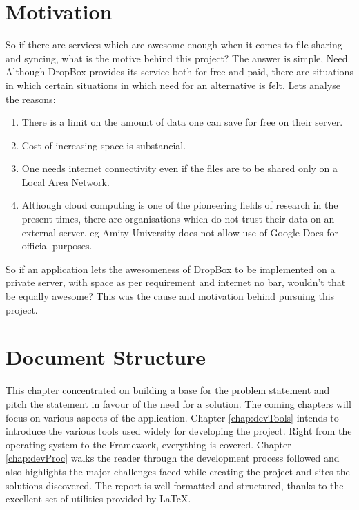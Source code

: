 \section{Motivation}
So if there are services which are awesome enough when it comes to file sharing and syncing, what is the motive behind this project? The answer is simple, Need. Although DropBox provides its service both for free and paid, there are situations in which certain situations in which need for an alternative is felt. Lets analyse the reasons:
\begin{enumerate}
  \item There is a limit on the amount of data one can save for free on their server.
  \item Cost of increasing space is substancial.
  \item One needs internet connectivity even if the files are to be shared only on a Local Area Network.
  \item Although cloud computing is one of the pioneering fields of research in the present times, there are organisations which do not trust their data on an external server. eg Amity University does not allow use of Google Docs for official purposes. 
\end{enumerate}
So if an application lets the awesomeness of DropBox to be implemented on a private server, with space as per requirement and internet no bar, wouldn't that be equally awesome?
This was the cause and motivation behind pursuing this project.

\section{Document Structure}
This chapter concentrated on building a base for the problem statement and pitch the statement in favour of the need for a solution. The coming chapters will focus on various aspects of the application.
Chapter \ref{chap:devTools} intends to introduce the various tools used widely for developing the project. Right from the operating system to the Framework, everything is covered.
Chapter \ref{chap:devProc} walks the reader through the development process followed and also highlights the major challenges faced while creating the project and sites the solutions discovered.
The report is well formatted and structured, thanks to the excellent set of utilities provided by \LaTeX. 
